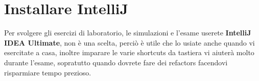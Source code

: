 \section{Installare IntelliJ}
    Per svolgere gli esercizi di laboratorio, le simulazioni e l'esame userete \textbf{IntelliJ IDEA Ultimate}, non è una scelta, perciò è utile che lo usiate anche 
    quando vi esercitate a casa, inoltre imparare le varie shortcuts da tastiera vi aiuterà molto durante l'esame, sopratutto quando dovrete fare dei refactors facendovi 
    risparmiare tempo prezioso.